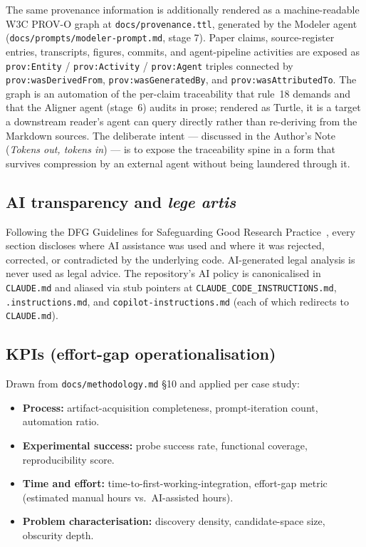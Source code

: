 \documentclass[11pt,a4paper]{article}
\begin{document}
The same provenance information is additionally rendered as a
machine-readable W3C PROV-O graph at \texttt{docs/provenance.ttl},
generated by the Modeler agent
(\texttt{docs/prompts/modeler-prompt.md}, stage 7). Paper claims,
source-register entries, transcripts, figures, commits, and
agent-pipeline activities are exposed as \texttt{prov:Entity} /
\texttt{prov:Activity} / \texttt{prov:Agent} triples connected by
\texttt{prov:wasDerivedFrom}, \texttt{prov:wasGeneratedBy}, and
\texttt{prov:wasAttributedTo}. The graph is an automation of the
per-claim traceability that rule~18 demands and that the Aligner
agent (stage~6) audits in prose; rendered as Turtle, it is a target
a downstream reader's agent can query directly rather than re-deriving
from the Markdown sources. The deliberate intent --- discussed in the
Author's Note (\emph{Tokens out, tokens in}) --- is to expose the
traceability spine in a form that survives compression by an external
agent without being laundered through it.

\subsection{AI transparency and \emph{lege artis}}
\label{sec:lege-artis}
Following the DFG Guidelines for Safeguarding Good Research
Practice~\citep{dfg2023}, every section discloses where AI assistance was
used and where it was rejected, corrected, or contradicted by the underlying
code. AI-generated legal analysis is never used as legal advice. The
repository's AI policy is canonicalised in
\texttt{CLAUDE.md} and aliased via stub pointers at
\texttt{CLAUDE\_CODE\_INSTRUCTIONS.md},
\texttt{.instructions.md}, and \texttt{copilot-instructions.md}
(each of which redirects to \texttt{CLAUDE.md}).

\subsection{KPIs (effort-gap operationalisation)}
\label{sec:kpis}
Drawn from \texttt{docs/methodology.md} \S 10 and applied per case study:
\begin{itemize}
  \item \textbf{Process:} artifact-acquisition completeness, prompt-iteration
        count, automation ratio.
  \item \textbf{Experimental success:} probe success rate, functional
        coverage, reproducibility score.
  \item \textbf{Time and effort:} time-to-first-working-integration,
        effort-gap metric (estimated manual hours vs.\ AI-assisted hours).
  \item \textbf{Problem characterisation:} discovery density, candidate-space
        size, obscurity depth.
\end{itemize}
\end{document}
